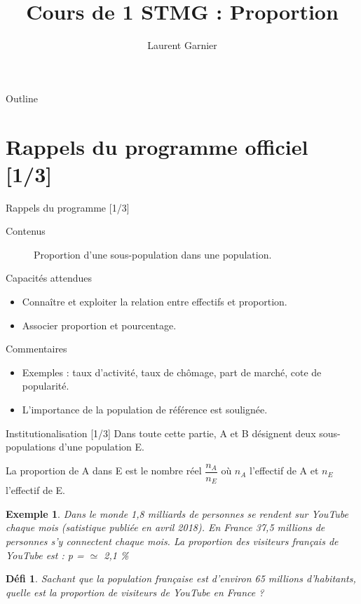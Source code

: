 \documentclass[presentation]{beamer}
\author{Laurent Garnier}
\date{}
\title{Cours de 1\up{ère} STMG : Proportion}
\newtheorem{defi}{Défi}[section]
\newtheorem{exe}{Exemple}[section]
\begin{document}
\maketitle
\begin{frame}{Outline}
\tableofcontents
\end{frame}



\section{Rappels du programme officiel [1/3]}
\label{sec:org438787e}
\begin{frame}[label={sec:orgb6847e2}]{Rappels du programme [1/3]}
\begin{description}
\item[{Contenus}] Proportion d'une sous-population dans une
population.
\item[{Capacités attendues}] 
\end{description}


\begin{itemize}
\item Connaître et exploiter la relation entre effectifs et
proportion.
\item Associer proportion et pourcentage.
\end{itemize}
\begin{description}
\item[{Commentaires}] 
\end{description}


\begin{itemize}
\item Exemples : taux d'activité, taux de chômage, part de marché,
cote de popularité.
\item L'importance de la population de référence est soulignée.
\end{itemize}
\end{frame}

\begin{frame}[label={sec:org27a09e8}]{Institutionalisation [1/3]}
Dans toute cette partie, A et B désignent deux sous-populations
d'une population E.

\begin{definition}
La \alert{proportion de A dans E} est le nombre réel \(\dfrac{n_A}{n_E}\) où
\(n_A\) l'effectif de A et \(n_E\) l'effectif de E.
\end{definition}

\begin{exe}
Dans le monde 1,8 milliards de personnes se rendent sur YouTube chaque mois 
(satistique publiée en avril 2018). En France 37,5 millions de personnes s'y 
connectent chaque mois. La proportion des visiteurs français de YouTube est : 
p =  \(\simeq\) 2,1 \%
\end{exe}

\begin{defi}
Sachant que la population française est d'environ 65 millions
d'habitants, quelle est la proportion de visiteurs de YouTube en
France ?
\end{defi}
\end{frame}
\end{document}

